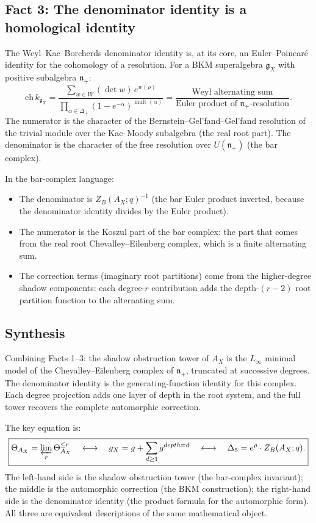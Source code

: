 \documentclass[11pt]{amsart}
\theoremstyle{definition}
\theoremstyle{remark}
\DeclareMathOperator{\mult}{mult}
\DeclareMathOperator{\depth}{depth}
\newcommand{\fg}{\mathfrak{g}}
\newcommand{\fn}{\mathfrak{n}}
\begin{document}
\subsection{Fact 3: The denominator identity is a homological
identity}

The Weyl--Kac--Borcherds denominator identity is, at its core,
an Euler--Poincar\'e identity for the cohomology of a
resolution. For a BKM superalgebra $\fg_X$ with positive
subalgebra $\fn_+$:
\begin{equation}\label{eq:denom-hom}
 \mathrm{ch}\, k_{\fg_X}
 = \frac{\sum_{w \in W} (\det w)\, e^{w(\rho)}}
 {\prod_{\alpha \in \Delta_+}
 (1 - e^{-\alpha})^{\mult(\alpha)}}
 = \frac{\text{Weyl alternating sum}}
 {\text{Euler product of $\fn_+$-resolution}}.
\end{equation}
The numerator is the character of the Bernstein--Gel'fand--Gel'fand
resolution of the trivial module over the Kac--Moody subalgebra
(the real root part). The denominator is the character of the
free resolution over $U(\fn_+)$ (the bar complex).

In the bar-complex language:
\begin{itemize}
 \item The denominator is $Z_B(A_X; q)^{-1}$ (the bar Euler
 product inverted, because the denominator identity divides
 by the Euler product).
 \item The numerator is the Koszul part of the bar complex:
 the part that comes from the real root Chevalley--Eilenberg
 complex, which is a finite alternating sum.
 \item The correction terms (imaginary root partitions) come
 from the higher-degree shadow components: each degree-$r$
 contribution adds the depth-$(r-2)$ root partition function
 to the alternating sum.
\end{itemize}

\subsection{Synthesis}

Combining Facts 1--3: the shadow obstruction tower of $A_X$ is the
$L_\infty$ minimal model of the Chevalley--Eilenberg complex of
$\fn_+$, truncated at successive degrees. The denominator
identity is the generating-function identity for this complex.
Each degree projection adds one layer of depth in the root system,
and the full tower recovers the complete automorphic correction.

The key equation is:
\begin{equation}\label{eq:key}
 \boxed{
 \Theta_{A_X} = \varprojlim_r \Theta^{\leq r}_{A_X}
 \quad \longleftrightarrow \quad
 \fg_X = \fg + \sum_{d \geq 1} \fg^{\depth = d}
 \quad \longleftrightarrow \quad
 \Delta_5 = e^{\rho} \cdot Z_B(A_X; q).
 }
\end{equation}
The left-hand side is the shadow obstruction tower (the bar-complex
invariant); the middle is the automorphic correction (the BKM
construction); the right-hand side is the denominator identity
(the product formula for the automorphic form). All three
are equivalent descriptions of the same mathematical object.
\end{document}
